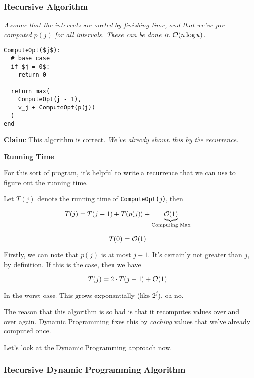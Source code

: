 \documentclass[12pt]{article}
\begin{document}

  \subsubsection{Recursive Algorithm}

  {\it Assume that the intervals are sorted by finishing time, and that we've
  pre-computed $p(j)$ for all intervals. These can be done in $\mathcal O(n \log n)$.}

  \begin{lstlisting}
ComputeOpt($j$):
  # base case
  if $j = 0$:
    return 0

  return max(
    ComputeOpt(j - 1),
    v_j + ComputeOpt(p(j))
  )
end
  \end{lstlisting}

  {\bf Claim}: This algorithm is correct. {\it We've already shown this by the
  recurrence}.

  {\bf Running Time}

  For this sort of program, it's helpful to write a recurrence that we can use
  to figure out the running time.

  Let $T(j)$ denote the running time of \texttt{ComputeOpt($j$)}, then

  \[
    T(j) = T(j - 1) + T(p(j)) + \underbrace{\mathcal O(1)}_\text{Computing Max}
  \]

  \[
    T(0) = \mathcal O(1)
  \]

  Firstly, we can note that $p(j)$ is at most $j - 1$. It's certainly not
  greater than $j$, by definition. If this is the case, then we have

  \[
    T(j) = 2 \cdot T(j - 1) + \mathcal O(1)
  \]

  In the worst case. This grows exponentially (like $2^j$), oh no.

  The reason that this algorithm is so bad is that it recomputes values over and
  over again. Dynamic Programming fixes this by {\it caching} values that we've
  already computed once.

  Let's look at the Dynamic Programming approach now.

  \subsubsection{Recursive Dynamic Programming Algorithm}
\end{document}
